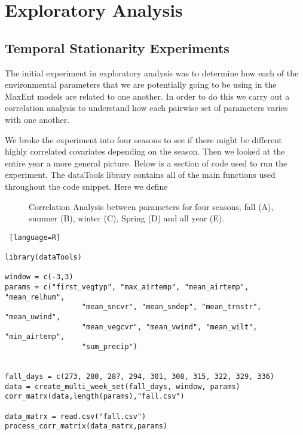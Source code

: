 
\chapter{Exploratory Analysis} %

\label{Chapter2} %






\section{Temporal Stationarity Experiments }

The initial experiment in exploratory analysis was to determine how each of the environmental parameters that we are potentially going to be using in the MaxEnt models are related to one another. In order to do this we carry out a correlation analysis to understand how each pairwise set of parameters varies with one another. \newline

\noindent We broke the experiment into four seasons to see if there might be different highly correlated covariates depending on the season. Then we looked at the entire year a more general picture. Below is a section of code used to run the experiment. The dataTools library contains all of the main functions used throughout the code snippet. Here we define 

\begin{figure} [!ht]
\centerline{}
\caption{Correlation Analysis between parameters for four seasons, fall (A), summer (B), winter (C), Spring (D) and all year (E).}
\label{fig6}
\end{figure}


\begin{lstlisting} [language=R]

library(dataTools)

window = c(-3,3)
params = c("first_vegtyp", "max_airtemp", "mean_airtemp", "mean_relhum", 
                  "mean_sncvr", "mean_sndep", "mean_trnstr", "mean_uwind", 
                  "mean_vegcvr", "mean_vwind", "mean_wilt", "min_airtemp", 
                  "sum_precip")
           
           
fall_days = c(273, 280, 287, 294, 301, 308, 315, 322, 329, 336)
data = create_multi_week_set(fall_days, window, params)
corr_matrx(data,length(params),"fall.csv")

data_matrx = read.csv("fall.csv")
process_corr_matrix(data_matrx,params)

\end{lstlisting}

